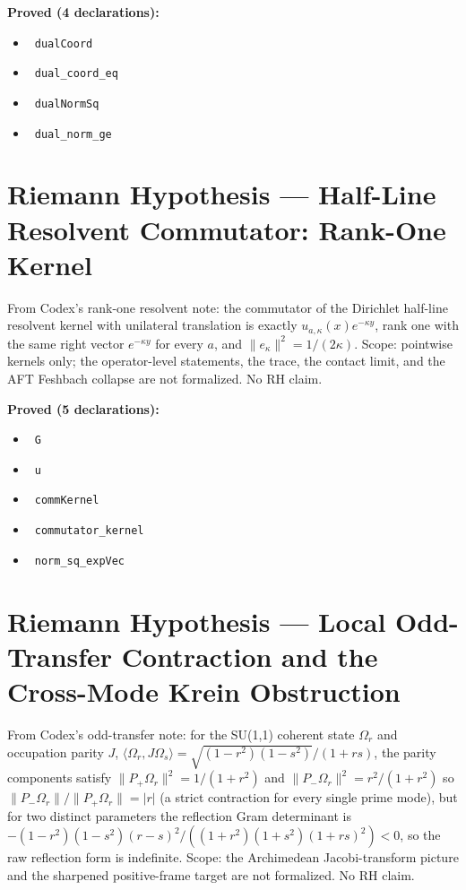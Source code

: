 \documentclass{report}
\theoremstyle{definition}
\begin{document}
\noindent\textbf{Proved (4 declarations):}
\begin{itemize}
  \item {}\leanok\ \texttt{dualCoord}
  \item {}\leanok\ \texttt{dual\_coord\_eq}
  \item {}\leanok\ \texttt{dualNormSq}
  \item {}\leanok\ \texttt{dual\_norm\_ge}
\end{itemize}

\section{Riemann Hypothesis --- Half-Line Resolvent Commutator: Rank-One Kernel}
From Codex's rank-one resolvent note: the commutator of the Dirichlet half-line resolvent kernel with unilateral translation is exactly $u_{a,\kappa}(x)e^{-\kappa y}$, rank one with the same right vector $e^{-\kappa y}$ for every $a$, and $\|e_\kappa\|^2=1/(2\kappa)$. Scope: pointwise kernels only; the operator-level statements, the trace, the contact limit, and the AFT Feshbach collapse are not formalized. No RH claim.

\noindent\textbf{Proved (5 declarations):}
\begin{itemize}
  \item {}\leanok\ \texttt{G}
  \item {}\leanok\ \texttt{u}
  \item {}\leanok\ \texttt{commKernel}
  \item {}\leanok\ \texttt{commutator\_kernel}
  \item {}\leanok\ \texttt{norm\_sq\_expVec}
\end{itemize}

\section{Riemann Hypothesis --- Local Odd-Transfer Contraction and the Cross-Mode Krein Obstruction}
From Codex's odd-transfer note: for the SU(1,1) coherent state $\Omega_r$ and occupation parity $J$, $\langle\Omega_r,J\Omega_s\rangle=\sqrt{(1-r^2)(1-s^2)}/(1+rs)$, the parity components satisfy $\|P_+\Omega_r\|^2=1/(1+r^2)$ and $\|P_-\Omega_r\|^2=r^2/(1+r^2)$ so $\|P_-\Omega_r\|/\|P_+\Omega_r\|=|r|$ (a strict contraction for every single prime mode), but for two distinct parameters the reflection Gram determinant is $-(1-r^2)(1-s^2)(r-s)^2/((1+r^2)(1+s^2)(1+rs)^2)<0$, so the raw reflection form is indefinite. Scope: the Archimedean Jacobi-transform picture and the sharpened positive-frame target are not formalized. No RH claim.
\end{document}
